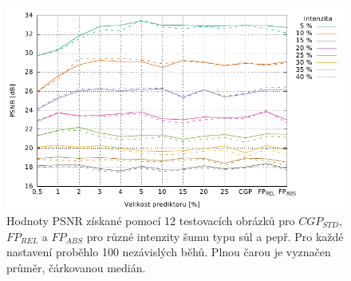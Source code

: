 \begin{figure}[htb]
    \centering
    \includegraphics[width=\textwidth]{fig/plot/compare/lineplot-psnr-sp-40.pdf}
    \caption{Hodnoty PSNR získané pomocí 12 testovacích obrázků pro $\mathit{CGP_{STD}}$, $\mathit{FP_{REL}}$ a $\mathit{FP_{ABS}}$ pro různé intenzity šumu typu sůl a pepř. Pro každé nastavení proběhlo 100 nezávislých běhů. Plnou čarou je vyznačen průměr, čárkovanou medián.}
    \label{plotComparisonSP40}
\end{figure}


